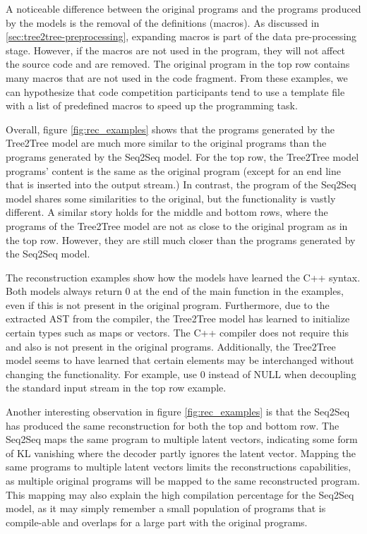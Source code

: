 A noticeable difference between the original programs and the programs produced by the models is the removal of the definitions (macros). 
As discussed in \ref{sec:tree2tree-preprocessing}, expanding macros is part of the data pre-processing stage. However, if the macros are not used in the program, they will not affect the source code and are removed. The original program in the top row contains many macros that are not used in the code fragment. From these examples, we can hypothesize that code competition participants tend to use a template file with a list of predefined macros to speed up the programming task.



Overall, figure \ref{fig:rec_examples} shows that the programs generated by the Tree2Tree model are much more similar to the original programs than the programs generated by the Seq2Seq model. For the top row, the Tree2Tree model programs' content is the same as the original program (except for an end line that is inserted into the output stream.) In contrast, the program of the Seq2Seq model shares some similarities to the original, but the functionality is vastly different. A similar story holds for the middle and bottom rows, where the programs of the Tree2Tree model are not as close to the original program as in the top row. However, they are still much closer than the programs generated by the Seq2Seq model. 



The reconstruction examples show how the models have learned the C++ syntax. Both models always return 0 at the end of the main function in the examples, even if this is not present in the original program. Furthermore, due to the extracted AST from the compiler, the Tree2Tree model has learned to initialize certain types such as maps or vectors. The C++ compiler does not require this and also is not present in the original programs. Additionally, the Tree2Tree model seems to have learned that certain elements may be interchanged without changing the functionality. For example, use 0 instead of NULL when decoupling the standard input stream in the top row example. 



Another interesting observation in figure \ref{fig:rec_examples} is that the Seq2Seq has produced the same reconstruction for both the top and bottom row. The Seq2Seq maps the same program to multiple latent vectors, indicating some form of KL vanishing where the decoder partly ignores the latent vector. Mapping the same programs to multiple latent vectors limits the reconstructions capabilities, as multiple original programs will be mapped to the same reconstructed program. This mapping may also explain the high compilation percentage for the Seq2Seq model, as it may simply remember a small population of programs that is compile-able and overlaps for a large part with the original programs. 




